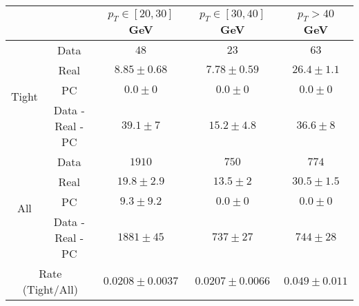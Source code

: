 \small
\begin{tabular}{|c|c||c|c|c|}
\hline
\multicolumn{2}{|c||}{} & $p_{T}\in[20,30]$ GeV & $p_{T}\in[30,40]$ GeV & $p_{T} > 40$ GeV\\ 
\hline
\hline
\multirow{4}{*}{Tight} & Data  &  $48$ &  $23$ &  $63$\\ 
&Real &  $8.85 \pm 0.68$ &  $7.78 \pm 0.59$ &  $26.4 \pm 1.1$\\ 
&PC &  $0.0 \pm 0$ &  $0.0 \pm 0$ &  $0.0 \pm 0$\\ 
\cline{2-5}
&Data - Real - PC &  $39.1 \pm 7$ &  $15.2 \pm 4.8$ &  $36.6 \pm 8$\\ 
\hline \hline
\multirow{4}{*}{All}&Data &  $1910$ &  $750$ &  $774$\\ 
&Real &  $19.8 \pm 2.9$ &  $13.5 \pm 2$ &  $30.5 \pm 1.5$\\ 
&PC &  $9.3 \pm 9.2$ &  $0.0 \pm 0$ &  $0.0 \pm 0$\\ 
\cline{2-5}
&Data - Real - PC&  $1881 \pm 45$ &  $737 \pm 27$ &  $744 \pm 28$\\ 
\hline \hline
\multicolumn{2}{|c||}{Rate (Tight/All)} &  $0.0208 \pm 0.0037$ &  $0.0207 \pm 0.0066$ &  $0.049 \pm 0.011$\\ 
\hline
\end{tabular}
